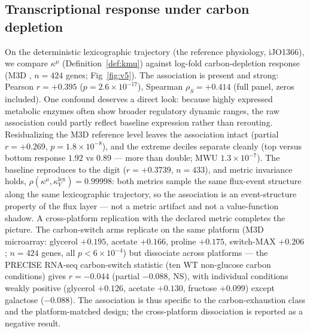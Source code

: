 \documentclass[11pt,a4paper]{article}
\theoremstyle{plain}
\theoremstyle{definition}
\theoremstyle{remark}
\newcommand{\kk}{\kappa_{\!V}}
\newcommand{\kmu}{\kappa^{\mu}}
\begin{document}
\subsection{Transcriptional response under carbon depletion}
\label{sec:v5}
On the deterministic lexicographic trajectory (the reference physiology, iJO1366),
we compare $\kmu$ (Definition~\ref{def:kmu}) against log-fold
carbon-depletion response (M3D \citep{faith2008}, $n = 424$ genes;
Fig~\ref{fig:v5}). The association is present and strong: Pearson
$r = +0.395$ ($p = 2.6 \times 10^{-17}$), Spearman
$\rho_S = +0.414$ (full panel, zeros included). One confound
deserves a direct look: because highly expressed metabolic enzymes
often show broader regulatory dynamic ranges, the raw association
could partly reflect baseline expression rather than rerouting.
Residualizing the M3D reference level leaves the association intact
(partial $r = +0.269$, $p = 1.8 \times 10^{-8}$), and the extreme
deciles separate cleanly (top versus bottom response $1.92$ vs
$0.89$ --- more than double; MWU $1.3 \times 10^{-7}$). The baseline reproduces to the
digit ($r = +0.3739$, $n = 433$), and metric invariance holds,
$\rho(\kmu, \kk^{\mathrm{lex}}) = 0.99998$: both metrics sample the
same flux-event structure along the same lexicographic trajectory,
so the association is an event-structure property of the flux layer ---
not a metric artifact and not a value-function shadow. A
cross-platform replication with the declared metric completes the
picture. The carbon-switch arms replicate on the same platform (M3D
microarray: glycerol $+0.195$, acetate $+0.166$, proline $+0.175$,
switch-MAX $+0.206$; $n = 424$ genes, all $p < 6 \times 10^{-4}$)
but dissociate across platforms --- the PRECISE RNA-seq
carbon-switch statistic (ten WT non-glucose carbon conditions)
gives $r = -0.044$ (partial $-0.088$, NS), with individual
conditions weakly positive (glycerol $+0.126$, acetate $+0.130$,
fructose $+0.099$) except galactose ($-0.088$). The association is
thus specific to the carbon-exhaustion class and the platform-matched
design; the cross-platform dissociation is reported as a negative
result.
\end{document}
